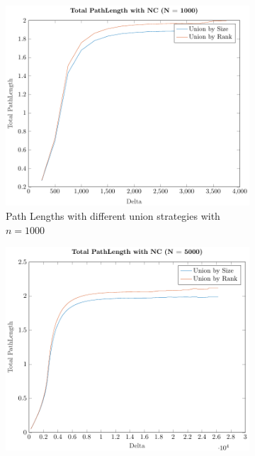 \begin{figure}[ht]
    \centering
    \begin{subfigure}{0.32\textwidth}
        \centering
        \includegraphics[width=\textwidth]{../images/plotNCNonFull1000_PathLength.pdf}
        \caption{Path Lengths with different union strategies with $n = 1000$}
    \end{subfigure}%
    \hfill
    \begin{subfigure}{0.32\textwidth}
        \centering
        \includegraphics[width=\textwidth]{../images/plotNCNonFull5000_PathLength.pdf}

\end{subfigure}
\end{figure}
